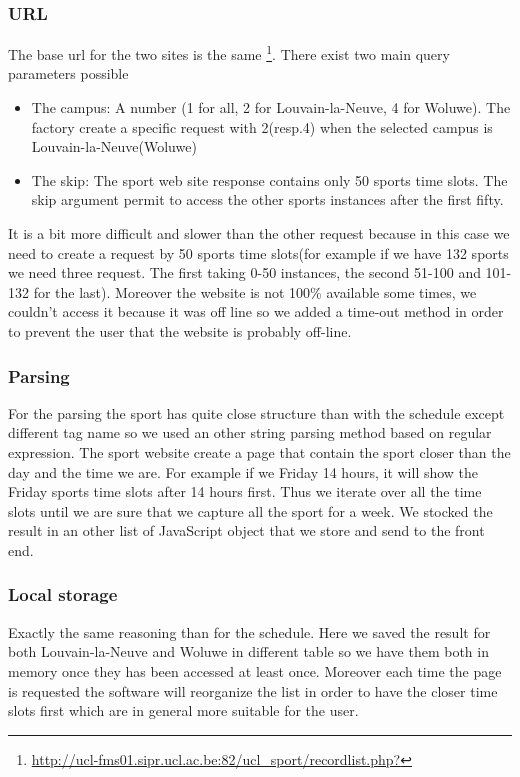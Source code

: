\documentclass[11pt, a4paper]{report}
\begin{document}
\subsubsection{URL}
The base url for the two sites is the same \footnote{\url{http://ucl-fms01.sipr.ucl.ac.be:82/ucl_sport/recordlist.php?}}. There exist two main query parameters possible
\begin{itemize}
\item The campus: A number (1 for all, 2 for Louvain-la-Neuve, 4 for Woluwe). The factory create a specific request with 2(resp.4) when the selected campus is Louvain-la-Neuve(Woluwe)
\item The skip: The sport web site response contains only 50 sports time slots. The skip argument permit to access the other sports instances after the first fifty.
\end{itemize}
It is a bit more difficult and slower than the other request because in this case we need to create a request by 50 sports time slots(for example if we have 132 sports we need three request. The first taking 0-50 instances, the second 51-100 and 101-132 for the last). Moreover the website is not 100\% available some times, we couldn't access it because it was off line so we added a time-out method in order to prevent the user that the website is probably off-line.
\subsubsection{Parsing}
For the parsing the sport has quite close structure than with the schedule except different tag name so we used an other string parsing method based on regular expression. The sport website create a page that contain the sport closer than the day and the time we are. For example if we Friday 14 hours, it will show the Friday sports time slots after 14 hours first. Thus we iterate over all the time slots until we are sure that we capture all the sport for a week. We stocked the result in an other list of JavaScript object that we store and send to the front end.
\subsubsection{Local storage}
Exactly the same reasoning than for the schedule. Here we saved the result for both Louvain-la-Neuve and Woluwe in different table so we have them both in memory once they has been accessed at least once. Moreover each time the page is requested the software will reorganize the list in order to have the closer time slots first which are in general more suitable for the user. 
\end{document}

